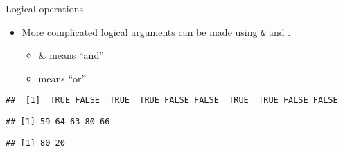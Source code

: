 \begin{frame}[fragile]{Logical operations}
\protect\hypertarget{logical-operations-2}{}

\begin{itemize}
\tightlist
\item
  More complicated logical arguments can be made using \texttt{\&} and
  \texttt{\textbar{}}.

  \begin{itemize}
  \item
    \& means ``and''
  \item
    means ``or''
  \end{itemize}
\end{itemize}

\begin{Shaded}
\begin{Highlighting}[]
\OperatorTok{>}\StringTok{ }\NormalTok{) }\OperatorTok{&}\StringTok{ }\OperatorTok{<=}\StringTok{ }\NormalTok{) }
\end{Highlighting}
\end{Shaded}

\begin{verbatim}
##  [1]  TRUE FALSE  TRUE  TRUE FALSE FALSE  TRUE  TRUE FALSE FALSE
\end{verbatim}

\begin{Shaded}
\begin{Highlighting}[]
\NormalTok{a[(a }\OperatorTok{>}\StringTok{ }\NormalTok{) }\OperatorTok{&}\StringTok{ }\OperatorTok{<=}\StringTok{ }\NormalTok{)]}
\end{Highlighting}
\end{Shaded}

\begin{verbatim}
## [1] 59 64 63 80 66
\end{verbatim}

\begin{Shaded}
\begin{Highlighting}[]
\NormalTok{a[(a }\OperatorTok{<=}\StringTok{ }\NormalTok{) }\OperatorTok{|}\StringTok{ }\OperatorTok{>=}\NormalTok{)]}
\end{Highlighting}
\end{Shaded}

\begin{verbatim}
## [1] 80 20
\end{verbatim}

\end{frame}

